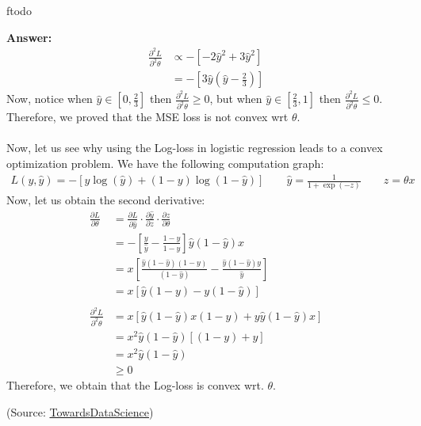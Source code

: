 ƒtodo\documentclass{article}
\newenvironment{QandA}{\begin{enumerate}[label=\arabic*.]}{\end{enumerate}}
\newenvironment{answer}{\par\normalfont \textbf{Answer:}}{}
\begin{document}
\begin{QandA}
\begin{answer}
\begin{align*}
            \frac{\partial^2 L}{\partial^2 \theta} &\propto -\left[ -2\hat{y}^2 + 3\hat{y}^2 \right] \\
            &= -\left[ 3\hat{y} (\hat{y} - \frac{2}{3})\right]
        \end{align*}
        Now, notice when $\hat{y} \in \left[ 0, \frac{2}{3}\right]$ then $\frac{\partial^2 L}{\partial^2 \theta} \ge 0$, but when $\hat{y} \in \left[ \frac{2}{3}, 1\right]$ then $\frac{\partial^2 L}{\partial^2 \theta} \le 0$. Therefore, we proved that the MSE loss is not convex wrt $\theta$.\\\\
        Now, let us see why using the Log-loss in logistic regression leads to a convex optimization problem. We have the following computation graph:
        \begin{align*}
            L(y, \hat{y}) = - \left[y\log(\hat{y}) + (1-y) \log(1-\hat{y})\right] \quad\quad \hat{y} = \frac{1}{1 + \exp(-z)} \quad\quad z = \theta x
        \end{align*}
        Now, let us obtain the second derivative:
        \begin{align*}
            \frac{\partial L}{\partial \theta} &= \frac{\partial L}{\partial \hat{y}} \cdot \frac{\partial \hat{y}}{\partial z} \cdot \frac{\partial z}{\partial \theta} \\
            &= -\left[ \frac{y}{\hat{y}} - \frac{1-y}{1-\hat{y}} \right]\hat{y}(1-\hat{y})x \\
            &= x \left[ \frac{\hat{y}(1-\hat{y})(1-y)}{(1-\hat{y})} - \frac{\hat{y}(1-\hat{y})y}{\hat{y}} \right] \\
            &= x \left[ \hat{y}(1-y) - y(1-\hat{y}) \right] \\\\
            \frac{\partial^2 L}{\partial^2 \theta} &= x \left[ \hat{y}(1-\hat{y})x(1-y) + y\hat{y}(1-\hat{y})x \right] \\
            &= x^2 \hat{y} (1-\hat{y}) \left[ (1 - y) + y \right] \\
            &= x^2\hat{y}(1-\hat{y})\\
            &\ge 0
        \end{align*}
        Therefore, we obtain that the Log-loss is convex wrt. $\theta$.

        (Source: \href{https://towardsdatascience.com/why-not-mse-as-a-loss-function-for-logistic-regression-589816b5e03c}{TowardsDataScience})
    \end{answer}


\end{QandA}
\end{document}

